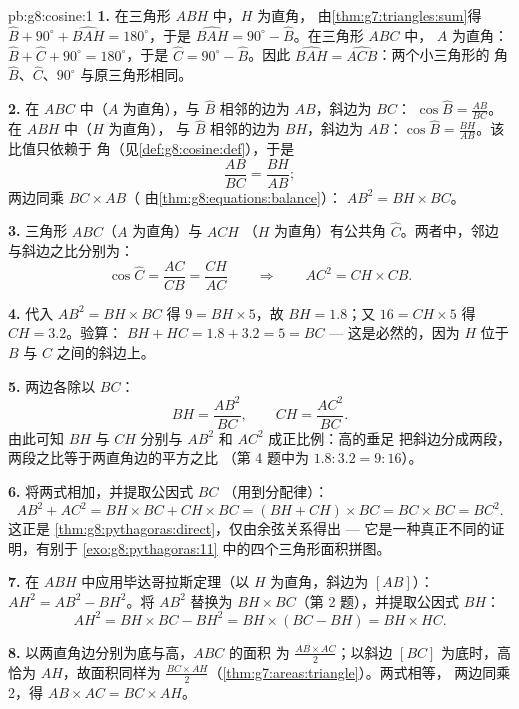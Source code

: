\begin{solution}{pb:g8:cosine:1}
\textbf{1.} 在三角形 $ABH$ 中，$H$ 为直角，
由\cref{thm:g7:triangles:sum}得
$\widehat B + 90^\circ + \widehat{BAH} = 180^\circ$，于是
$\widehat{BAH} = 90^\circ - \widehat B$。在三角形 $ABC$ 中，
$A$ 为直角：
$\widehat B + \widehat C + 90^\circ = 180^\circ$，于是
$\widehat C = 90^\circ - \widehat B$。因此
$\widehat{BAH} = \widehat{ACB}$：两个小三角形的
角 $\widehat B$、$\widehat C$、$90^\circ$ 与原三角形相同。

\textbf{2.} 在 $ABC$ 中（$A$ 为直角），与 $\widehat B$ 相邻的边为
$AB$，斜边为 $BC$：
$\cos\widehat B = \frac{AB}{BC}$。在 $ABH$ 中（$H$ 为直角），
与 $\widehat B$ 相邻的边为 $BH$，斜边为
$AB$：$\cos\widehat B = \frac{BH}{AB}$。该比值只依赖于
角（见\cref{def:g8:cosine:def}），于是
\[
\frac{AB}{BC} = \frac{BH}{AB} ;
\]
两边同乘 $BC \times AB$（
由\cref{thm:g8:equations:balance}）：
$AB^2 = BH \times BC$。

\textbf{3.} 三角形 $ABC$（$A$ 为直角）与 $ACH$
（$H$ 为直角）有公共角 $\widehat C$。两者中，邻边
与斜边之比分别为：
\[
\cos\widehat C = \frac{AC}{CB} = \frac{CH}{AC}
\qquad\Longrightarrow\qquad
AC^2 = CH \times CB .
\]

\textbf{4.} 代入 $AB^2 = BH \times BC$ 得 $9 = BH \times 5$，故
$BH = 1.8$；又 $16 = CH \times 5$ 得 $CH = 3.2$。验算：
$BH + HC = 1.8 + 3.2 = 5 = BC$ --- 这是必然的，因为 $H$
位于 $B$ 与 $C$ 之间的斜边上。

\textbf{5.} 两边各除以 $BC$：
\[
BH = \frac{AB^2}{BC},
\qquad
CH = \frac{AC^2}{BC} .
\]
由此可知 $BH$ 与 $CH$ 分别与 $AB^2$ 和 $AC^2$ 成正比例：高的垂足
把斜边分成两段，两段之比等于两直角边的平方之比
（第 4 题中为 $1.8 : 3.2 = 9 : 16$）。

\textbf{6.} 将两式相加，并提取公因式 $BC$
（用到分配律）：
\[
AB^2 + AC^2 = BH \times BC + CH \times BC
= (BH + CH) \times BC = BC \times BC = BC^2 .
\]
这正是 \cref{thm:g8:pythagoras:direct}，仅由余弦关系得出 ---
它是一种真正不同的证明，有别于
\cref{exo:g8:pythagoras:11} 中的四个三角形面积拼图。

\textbf{7.} 在 $ABH$ 中应用毕达哥拉斯定理（以 $H$ 为直角，斜边为
$[AB]$）：$AH^2 = AB^2 - BH^2$。将 $AB^2$ 替换为
$BH \times BC$（第 2 题），并提取公因式 $BH$：
\[
AH^2 = BH \times BC - BH^2
= BH \times (BC - BH)
= BH \times HC .
\]

\textbf{8.} 以两直角边分别为底与高，$ABC$ 的面积
为 $\frac{AB \times AC}{2}$；以斜边 $[BC]$ 为底时，高恰为
$AH$，故面积同样为
$\frac{BC \times AH}{2}$（\cref{thm:g7:areas:triangle}）。两式相等，
两边同乘 2，得 $AB \times AC = BC \times AH$。


\end{solution}
